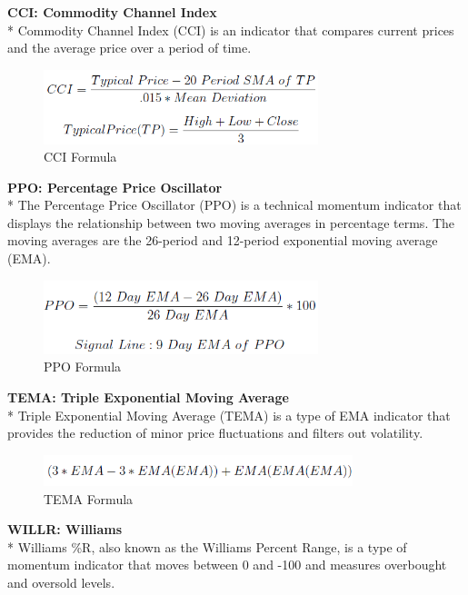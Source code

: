 \documentclass{article}
\begin{document}
\noindent
\textbf{CCI: Commodity Channel Index} \\*
Commodity Channel Index (CCI) is an indicator that compares current prices and the average price over a period of time.
\begin{figure}[H]
\begin{center}
   \includegraphics[width=80mm,scale=0.8]{assets/formulas/cci.png}
   \caption{CCI Formula}
\end{center}
\end{figure}
\noindent
\textbf{PPO: Percentage Price Oscillator} \\*
The Percentage Price Oscillator (PPO) is a technical momentum indicator that displays the relationship between two moving averages in percentage terms. The moving averages are the 26-period and 12-period exponential moving average (EMA).
\begin{figure}[H]
\begin{center}
   \includegraphics[width=80mm,scale=0.8]{assets/formulas/ppo.png}
   \caption{PPO Formula}
\end{center}
\end{figure}
\noindent
\textbf{TEMA: Triple Exponential Moving Average} \\*
Triple Exponential Moving Average (TEMA) is a type of EMA indicator that provides the reduction of minor price fluctuations and filters out volatility.
\begin{figure}[H]
\begin{center}
   \includegraphics[width=90mm,scale=0.8]{assets/formulas/tema.png}
   \caption{TEMA Formula}
\end{center}
\end{figure}
\noindent
\textbf{WILLR: Williams} \\*
Williams \%R, also known as the Williams Percent Range, is a type of momentum indicator that moves between 0 and -100 and measures overbought and oversold levels.
\end{document}

